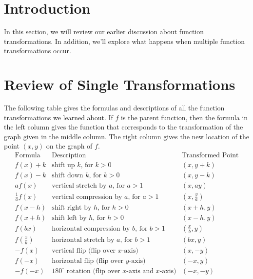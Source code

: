 \documentclass[handout, noauthor, nooutcomes]{ximera}
\begin{document}

\section{Introduction}
In this section, we will review our earlier discussion about function transformations. In addition, we'll explore what happens when multiple function transformations occur. 

\section{Review of Single Transformations}
The following table gives the formulas and descriptions of all the function transformations we learned about. If $f$ is the parent function, then the formula in the left column gives the function that corresponds to the transformation of the graph given in the middle column. The right column gives the new location of the point $(x, y)$ on the graph of $f$. 
$$
\begin{array}{c|c|c}
\text{Formula} & \text{Description} & \text{Transformed Point}\\
\hline
f(x) + k & \text{shift up }k\text{, for } k > 0 &(x, y + k) \\
f(x) - k & \text{shift down }k\text{, for } k > 0& (x, y - k)\\
af(x) & \text{vertical stretch by }a\text{, for }a > 1 & (x, ay)\\
\frac{1}{a}f(x) & \text{vertical compression by }a\text{, for }a > 1 & \left(x, \frac{y}{a}\right)\\
f(x - h) & \text{shift right by }h\text{, for }h > 0 & (x + h, y)\\
f(x + h) & \text{shift left by }h\text{, for }h > 0 & (x - h, y)\\
f(bx) & \text{horizontal compression by }b\text{, for }b > 1 & \left(\frac{x}{b}, y \right)\\
f\left(\frac{x}{b}\right) & \text{horizontal stretch by }a\text{, for }b > 1 & (bx, y)\\
-f(x) & \text{vertical flip (flip over }x\text{-axis)} & (x, -y)\\
f(-x) & \text{horizontal flip (flip over }y\text{-axis)} & (-x, y)\\
-f(-x) & \text{180}^\circ\text{ rotation (flip over }x\text{-axis and }x\text{-axis)} & (-x, -y)\\
\end{array}
$$
\end{document}
